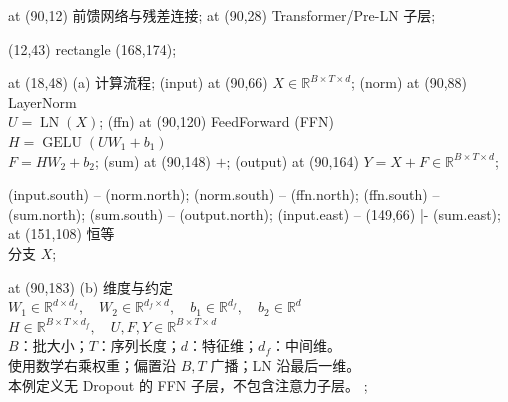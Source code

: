 \begin{papercodepage}
  \node[pagetitle,anchor=north,text width=156mm] at (90,12)
    {前馈网络与残差连接};
  \node[annotation,anchor=north,align=center] at (90,28)
    {Transformer\quad /\quad Pre-LN 子层};

  \begin{scope}
    \draw[sectionbox] (12,43) rectangle (168,174);
  \end{scope}
  \node[sectiontitle] at (18,48) {(a) 计算流程};
  \node[dimension] (input) at (90,66)
    {$X\in\mathbb{R}^{B\times T\times d}$};
  \node[basicblock,text width=58mm] (norm) at (90,88)
    {{\PaperModuleFont LayerNorm}\\[1mm]
     $U=\operatorname{LN}(X)$};
  \node[keyblock,text width=82mm] (ffn) at (90,120)
    {{\PaperModuleFont FeedForward (FFN)}\\[1.5mm]
     $H=\operatorname{GELU}(UW_1+b_1)$\\[1mm]
     $F=HW_2+b_2$};
  \node[sumblock] (sum) at (90,148) {$+$};
  \node[dimension,text width=110mm] (output) at (90,164)
    {$Y=X+F\in\mathbb{R}^{B\times T\times d}$};

  \draw[flowarrow] (input.south) -- (norm.north);
  \draw[flowarrow] (norm.south) -- (ffn.north);
  \draw[flowarrow] (ffn.south) -- (sum.north);
  \draw[flowarrow] (sum.south) -- (output.north);
  \draw[flowarrow] (input.east) -- (149,66) |- (sum.east);
  \node[annotation,anchor=west,inner sep=1mm] at (151,108) {恒等\\分支 $X$};

  \node[noteblock,anchor=north,text width=144mm] at (90,183) {
    {\PaperModuleFont (b) 维度与约定}\\[1.5mm]
    $W_1\in\mathbb{R}^{d\times d_f},\quad
     W_2\in\mathbb{R}^{d_f\times d},\quad
     b_1\in\mathbb{R}^{d_f},\quad b_2\in\mathbb{R}^{d}$\\[1mm]
    $H\in\mathbb{R}^{B\times T\times d_f},\quad
     U,F,Y\in\mathbb{R}^{B\times T\times d}$\\[1mm]
    {\PaperNoteFont $B$：批大小；$T$：序列长度；$d$：特征维；$d_f$：中间维。\\
    使用数学右乘权重；偏置沿 $B,T$ 广播；LN 沿最后一维。\\
    本例定义无 Dropout 的 FFN 子层，不包含注意力子层。}
  };
\end{papercodepage}
